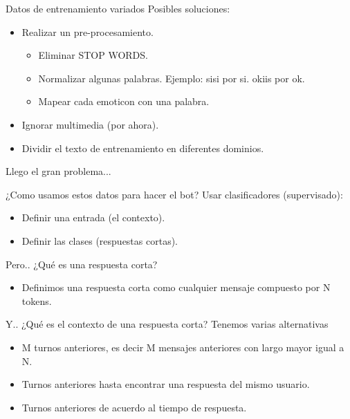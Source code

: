 \documentclass{beamer}
\begin{document}
\begin{frame}{Datos de entrenamiento variados}
	Posibles soluciones:
    \begin{itemize}
      	\item Realizar un pre-procesamiento.
        \pause
        \begin{itemize}
          	 \item Eliminar STOP WORDS.
             \item Normalizar algunas palabras. Ejemplo: sisi por si. okiis por ok.
             \item Mapear cada emoticon con una palabra.
        \end{itemize}
        \pause
        \item Ignorar multimedia (por ahora).
        \item Dividir el texto de entrenamiento en diferentes dominios.
     \end{itemize}
\end{frame}

\begin{frame}{Llego el gran problema...}
	\begin{block}{¿Como usamos estos datos para hacer el bot?}
    	\pause
        Usar clasificadores (supervisado):
    	\begin{itemize}
            \item Definir una entrada (el contexto).
        	\item Definir las clases (respuestas cortas).
        \end{itemize}
    \end{block}
\end{frame}

\begin{frame}
	\begin{block}{Pero.. ¿Qué es una respuesta corta?}
		\begin{itemize}
        	\item Definimos una respuesta corta como cualquier mensaje compuesto por N tokens.
        \end{itemize}
	\end{block}
    \pause
	\begin{block}{Y.. ¿Qué es el contexto de una respuesta corta?}
    	Tenemos varias alternativas
    	\begin{itemize}
    		\item M turnos anteriores, es decir M mensajes anteriores con largo mayor igual a N. 
            \item Turnos anteriores hasta encontrar una respuesta del mismo usuario.
            \item Turnos anteriores de acuerdo al tiempo de respuesta. %
   		\end{itemize}
	\end{block}
\end{frame}
\end{document}
